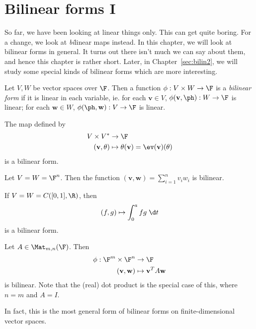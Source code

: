 \documentclass[a4paper]{article}
\begin{document}
\section{Bilinear forms I}
\label{sec:bilin1}
So far, we have been looking at linear things only. This can get quite boring. For a change, we look at \emph{bi}linear maps instead. In this chapter, we will look at bilinear forms in general. It turns out there isn't much we can say about them, and hence this chapter is rather short. Later, in Chapter~\ref{sec:bilin2}, we will study some special kinds of bilinear forms which are more interesting.

\begin{defi}
  Let $V, W$ be vector spaces over $\F$. Then a function $\phi: V\times W \to \F$ is a \emph{bilinear form} if it is linear in each variable, ie. for each $\mathbf{v} \in V$, $\phi(\mathbf{v}, \ph): W \to \F$ is linear; for each $\mathbf{w} \in W$, $\phi(\ph, \mathbf{w}): V\to \F$ is linear.
\end{defi}

\begin{eg}
  The map defined by
  \begin{align*}
    V\times V^* &\to \F\\
    (\mathbf{v}, \theta) &\mapsto \theta(\mathbf{v}) = \ev(\mathbf{v})(\theta)
  \end{align*}
  is a bilinear form.
\end{eg}

\begin{eg}
  Let $V = W = \F^n$. Then the function $(\mathbf{v}, \mathbf{w}) = \sum_{i = 1}^n v_i w_i$ is bilinear.
\end{eg}

\begin{eg}
  If $V = W = C([0, 1], \R)$, then
  \[
    (f, g) \mapsto \int_0^a fg \;\d t
  \]
  is a bilinear form.
\end{eg}

\begin{eg}
  Let $A \in \Mat_{m, n}(\F)$. Then
  \begin{align*}
    \phi: \F^m \times \F^n &\to \F\\
       (\mathbf{v}, \mathbf{w}) &\mapsto \mathbf{v}^T A\mathbf{w}
  \end{align*}
  is bilinear. Note that the (real) dot product is the special case of this, where $n = m$ and $A = I$.
\end{eg}
In fact, this is the most general form of bilinear forms on finite-dimensional vector spaces.
\end{document}
